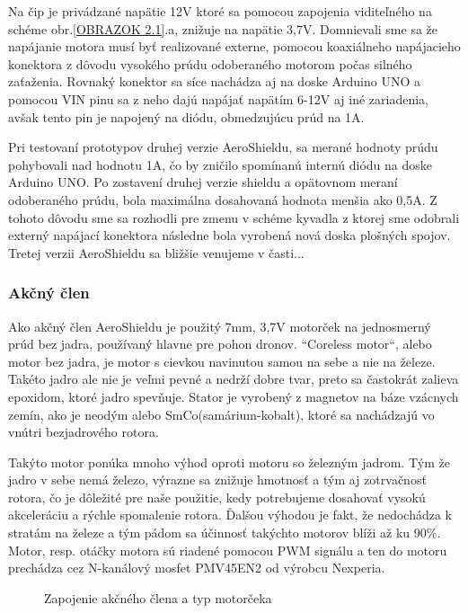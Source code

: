 Na čip je privádzané napätie 12V ktoré sa pomocou zapojenia viditeľného na schéme obr.\ref{OBRAZOK 2.1}.a, znižuje na napätie 3,7V. Domnievali sme sa že napájanie motora musí byť realizované externe, pomocou koaxiálneho napájacieho konektora z dôvodu vysokého prúdu odoberaného motorom počas silného zaťaženia. Rovnaký konektor sa síce nachádza aj na doske Arduino UNO a pomocou VIN pinu sa z neho dajú napájať napätím 6-12V aj iné zariadenia, avšak tento pin je napojený na diódu, obmedzujúcu prúd na 1A\cite{ampere}\cite{ampere2}. 

Pri testovaní prototypov druhej verzie AeroShieldu, sa merané hodnoty prúdu pohybovali nad hodnotu 1A, čo by zničilo spomínanú internú diódu na doske Arduino UNO. 
Po zostavení druhej verzie shieldu a opätovnom meraní odoberaného prúdu, bola maximálna dosahovaná hodnota menšia ako 0,5A. Z tohoto dôvodu sme sa rozhodli pre zmenu v schéme kyvadla z ktorej sme odobrali externý napájací konektora následne bola vyrobená nová doska plošných spojov. Tretej verzii AeroShieldu sa bližšie venujeme v časti...

\subsubsection{Akčný člen}
\label{akcclen}

Ako akčný člen AeroShieldu je použitý 7mm, 3,7V motorček na jednosmerný prúd bez jadra, používaný hlavne pre pohon dronov. “Coreless motor“, alebo motor bez jadra, je motor s cievkou navinutou samou na sebe a nie na železe\cite{coreless}. Takéto jadro ale nie je veľmi pevné a nedrží dobre tvar, preto sa častokrát zalieva epoxidom, ktoré jadro spevňuje. Stator je vyrobený z magnetov na báze vzácnych zemín, ako je neodým alebo SmCo(samárium-kobalt), ktoré sa nachádzajú vo vnútri bezjadrového rotora.

Takýto motor ponúka mnoho výhod oproti motoru so železným jadrom. Tým že jadro v sebe nemá železo, výrazne sa znižuje hmotnosť a tým aj zotrvačnosť rotora, čo je dôležité pre naše použitie, kedy potrebujeme dosahovať vysokú akceleráciu a rýchle spomalenie rotora. Ďalšou výhodou je fakt, že nedochádza k stratám na železe a tým pádom sa účinnosť takýchto motorov blíži až ku 90\%\cite{5545147}. Motor, resp. otáčky motora sú riadené pomocou PWM signálu a ten do motoru prechádza cez N-kanálový mosfet PMV45EN2 od výrobcu Nexperia\cite{pmv}.


\begin{figure}[!tbh]
	\hfill
	\hfill
	\hfill
	\caption{Zapojenie akčného člena a typ motorčeka}\label{OBRAZOK 2.3}
\end{figure}


